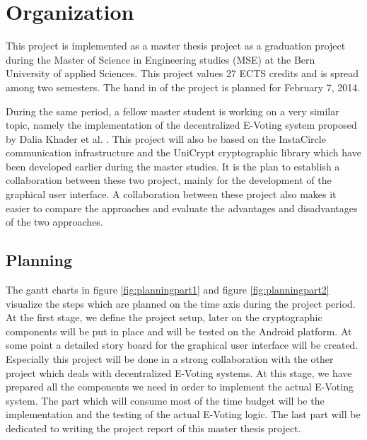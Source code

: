\documentclass[numbers=noenddot, abstract=on]{scrreprt}
\begin{document}
\chapter{Organization}
\label{cha:organization}
This project is implemented as a master thesis project as a graduation project
during the Master of Science in Engineering studies (MSE) at the Bern University
of applied Sciences. This project values 27 ECTS credits and is spread among two
semesters. The hand in of the project is planned for February 7, 2014.

During the same period, a fellow master student is working on a very similar
topic, namely the implementation of the decentralized E-Voting system proposed by
Dalia Khader et al. \cite{HKRS12}. This project will also be based on the
InstaCircle communication infrastructure \cite{ritter13a} and the UniCrypt
cryptographic library \cite{ritter12} which have been developed earlier during
the master studies. It is the plan to establish a collaboration between these
two project, mainly for the development of the graphical user interface. A
collaboration between these project also makes it easier to compare the
approaches and evaluate the advantages and disadvantages of the two approaches.

\section{Planning}
\label{sec:planning}
The gantt charts in figure \ref{fig:planningpart1} and figure
\ref{fig:planningpart2} visualize the steps which are planned on the time axis
during the project period. At the first stage, we define the project setup,
later on the cryptographic components will be put in place and will be tested on
the Android platform. At some point a detailed story board for the graphical
user interface will be created. Especially this project will be done in a strong
collaboration with the other project which deals with decentralized E-Voting
systems. At this stage, we have prepared all the components we need in order to
implement the actual E-Voting system. The part which will consume most of the
time budget will be the implementation and the testing of the actual E-Voting
logic. The last part will be dedicated to writing the project report of this
master thesis project.
\end{document}
